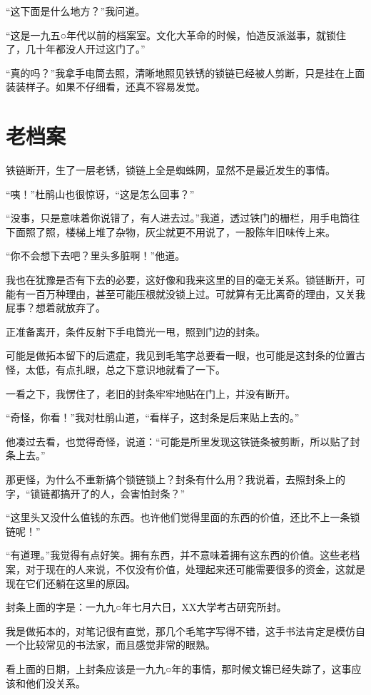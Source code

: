 “这下面是什么地方？”我问道。

“这是一九五○年代以前的档案室。文化大革命的时候，怕造反派滋事，就锁住了，几十年都没人开过这门了。”

“真的吗？”我拿手电筒去照，清晰地照见铁锈的锁链已经被人剪断，只是挂在上面装装样子。如果不仔细看，还真不容易发觉。

\chapter{老档案}

铁链断开，生了一层老锈，锁链上全是蜘蛛网，显然不是最近发生的事情。

“咦！”杜鹃山也很惊讶，“这是怎么回事？”

“没事，只是意味着你说错了，有人进去过。”我道，透过铁门的栅栏，用手电筒往下面照了照，楼梯上堆了杂物，灰尘就更不用说了，一股陈年旧味传上来。

“你不会想下去吧？里头多脏啊！”他道。

我也在犹豫是否有下去的必要，这好像和我来这里的目的毫无关系。锁链断开，可能有一百万种理由，甚至可能压根就没锁上过。可就算有无比离奇的理由，又关我屁事？想着就放弃了。

正准备离开，条件反射下手电筒光一甩，照到门边的封条。

可能是做拓本留下的后遗症，我见到毛笔字总要看一眼，也可能是这封条的位置古怪，太低，有点扎眼，总之下意识地就看了一下。

一看之下，我愣住了，老旧的封条牢牢地贴在门上，并没有断开。

“奇怪，你看！”我对杜鹃山道，“看样子，这封条是后来贴上去的。”

他凑过去看，也觉得奇怪，说道：“可能是所里发现这铁链条被剪断，所以贴了封条上去。”

那更怪，为什么不重新搞个锁链锁上？封条有什么用？我说着，去照封条上的字，“锁链都搞开了的人，会害怕封条？”

“这里头又没什么值钱的东西。也许他们觉得里面的东西的价值，还比不上一条锁链呢！”

“有道理。”我觉得有点好笑。拥有东西，并不意味着拥有这东西的价值。这些老档案，对于现在的人来说，不仅没有价值，处理起来还可能需要很多的资金，这就是现在它们还躺在这里的原因。

封条上面的字是：一九九○年七月六日，XX大学考古研究所封。

我是做拓本的，对笔记很有直觉，那几个毛笔字写得不错，这手书法肯定是模仿自一个比较常见的书法家，而且感觉非常的眼熟。

看上面的日期，上封条应该是一九九○年的事情，那时候文锦已经失踪了，这事应该和他们没关系。

